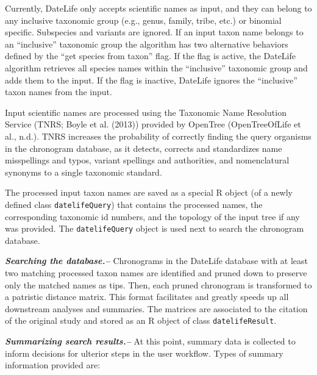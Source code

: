 \documentclass[
  english,
  man]{apa6}
\begin{document}
Currently, DateLife only accepts scientific names as input, and they can belong to any inclusive taxonomic group (e.g., genus, family, tribe, etc.) or binomial specific. Subspecies and variants are ignored. If an input taxon name belongs to an ``inclusive'' taxonomic group the algorithm has two alternative behaviors defined by the ``get species from taxon'' flag. If the flag is active, the DateLife algorithm retrieves all species names within the ``inclusive'' taxonomic group and adds them to the input. If the flag is inactive, DateLife ignores the ``inclusive'' taxon names from the input.

Input scientific names are processed using the Taxonomic Name Resolution Service (TNRS; Boyle et al. (2013)) provided by OpenTree (OpenTreeOfLife et al., n.d.). TNRS increases the probability of correctly finding the query organisms in the chronogram database, as it detects, corrects and standardizes name misspellings and typos, variant spellings and authorities, and nomenclatural synonyms to a single taxonomic standard.

The processed input taxon names are saved as a special R object (of a newly defined class \texttt{datelifeQuery}) that contains the processed names, the corresponding taxonomic id numbers, and the topology of the input tree if any was provided. The \texttt{datelifeQuery} object is used next to search the chronogram database.

\emph{\textbf{Searching the database.--}} Chronograms in the DateLife database with at least two matching processed taxon names are identified and pruned down to preserve only the matched names as tips. Then, each pruned chronogram is transformed to a patristic distance matrix. This format facilitates and greatly speeds up all downstream analyses and summaries. The matrices are associated to the citation of the original study and stored as an R object of class \texttt{datelifeResult}.

\emph{\textbf{Summarizing search results.--}} At this point, summary data is collected to inform decisions for ulterior steps in the user workflow. Types of summary information provided are:
\end{document}
